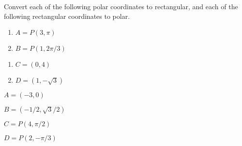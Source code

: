 {Convert each of the following polar coordinates to rectangular, and each of the following rectangular coordinates to polar.

\noindent\begin{minipage}[t]{.5\linewidth}
\begin{enumerate}
	\item $A=P(3,\pi)$
	\item $B=P(1,2\pi/3)$
\end{enumerate}
\end{minipage}
\begin{minipage}[t]{.5\linewidth}
\begin{enumerate}\addtocounter{enumii}{2}
	\item $C=(0,4)$
	\item $D=(1,-\sqrt{3})$
\end{enumerate}
\end{minipage}
}
{$A=(-3,0)$

$B=(-1/2,\sqrt{3}/2)$

$C=P(4,\pi/2)$

$D=P(2,-\pi/3)$

	}
